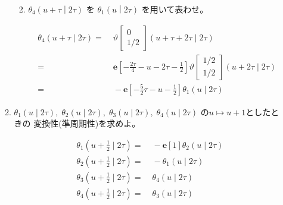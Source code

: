 \documentclass[12pt,b5paper]{ltjsarticle}
\begin{document}
\begin{enumerate}
\begin{enumerate}
\begin{enumerate}
                    \hrulefill

              \item $\displaystyle \theta_{4} \left(u+\tau \middle| 2\tau \right)$
                    を
                    $\displaystyle \theta_{1} \left(u \middle| 2\tau \right)$
                    を用いて表わせ。

                    \dotfill

                    \begin{align}
                     \theta_{4} \left(u+\tau \mid 2\tau \right)
                     =&\;
                     \vartheta \begin{bmatrix} 0 \\ 1/2 \end{bmatrix} (u+\tau+2\tau \mid 2\tau)\\
                     =&\;
                     \mathbf{e}[-\frac{2\tau}{4} -u-2\tau -\frac{1}{2}]
                     \vartheta \begin{bmatrix} 1/2 \\ 1/2 \end{bmatrix} (u+2\tau \mid 2\tau)\\
                     =&\; -\mathbf{e}[-\frac{5}{2}\tau -u -\frac{1}{2}]
                     \theta_{1} \left(u \mid 2\tau \right)
                    \end{align}

                    \hrulefill

             \end{enumerate}


        \item
             $\theta_{1}(u\mid 2\tau),\;\theta_{2}(u\mid 2\tau)
             ,\;\theta_{3}(u\mid 2\tau),\;\theta_{4}(u\mid 2\tau)$
             の$u \mapsto u+1$としたときの
             変換性(準周期性)を求めよ。

             \dotfill

             \begin{align}
              \theta_{1} (u + \frac{1}{2} \mid 2\tau)
              =&\; -\mathbf{e}[1] \theta_{2} \left(u \mid 2\tau \right)\\
              \theta_{2} (u+\frac{1}{2} \mid 2\tau )
              =&\; -\theta_{1} \left(u \mid 2\tau \right)\\
              \theta_{3} (u+\frac{1}{2} \mid 2\tau )
              =&\; \theta_{4} (u \mid 2\tau)\\
              \theta_{4} (u+\frac{1}{2} \mid 2\tau )
              =&\; \theta_{3} (u \mid 2\tau )
             \end{align}


\end{enumerate}
\end{enumerate}
\end{document}
